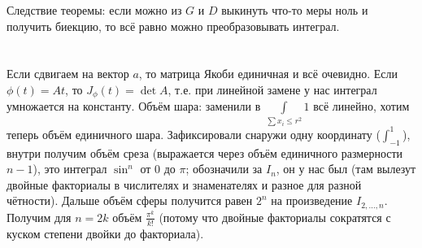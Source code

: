 Следствие теоремы: если можно из $G$ и $D$ выкинуть что-то меры ноль и получить биекцию, то всё равно можно преобразовывать интеграл.

\section{} %
Если сдвигаем на вектор $a$, то матрица Якоби единичная и всё очевидно.
Если $\phi(t) = At$, то $J_\phi(t) = \det A$, т.е. при линейной замене у нас интеграл умножается на константу.
Объём шара: заменили в $\int\limits_{\sum x_i \le r^2} 1$ всё линейно, хотим теперь объём единичного шара.
Зафиксировали снаружи одну координату ($\int_{-1}^1$), внутри получим объём среза (выражается через объём единичного размерности $n-1$),
это интеграл $\sin^n$ от $0$ до $\pi$; обозначили за $I_n$, он у нас был (там вылезут двойные факториалы в числителях и знаменателях и разное для разной чётности).
Дальше объём сферы получится равен $2^n$ на произведение $I_{2,\dots,n}$.
Получим для $n=2k$ объём $\frac{\pi^k}{k!}$ (потому что двойные факториалы сократятся с куском степени двойки до факториала).

\section{} %
\TODO
